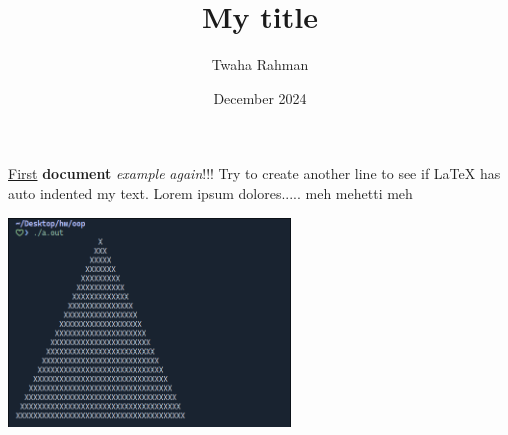 \documentclass[12pt, letterpaper]{article}
\title{My title}
\author{Twaha Rahman}
\date{December 2024}
\begin{document}
\maketitle  %

  \underline{First} \textbf{document} \textit{exa\emph{mpl}e} \emph{again}!!! Try to
  create another line to see if LaTeX has
  auto indented my text. Lorem ipsum dolores..... meh mehetti meh

  \includegraphics[width=7.5cm]{img1.png}
\end{document}
